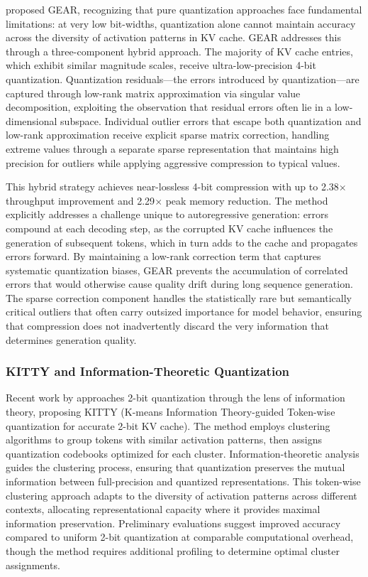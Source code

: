 \citet{kang2024gear} proposed GEAR, recognizing that pure quantization approaches face fundamental limitations: at very low bit-widths, quantization alone cannot maintain accuracy across the diversity of activation patterns in KV cache. GEAR addresses this through a three-component hybrid approach. The majority of KV cache entries, which exhibit similar magnitude scales, receive ultra-low-precision 4-bit quantization. Quantization residuals---the errors introduced by quantization---are captured through low-rank matrix approximation via singular value decomposition, exploiting the observation that residual errors often lie in a low-dimensional subspace. Individual outlier errors that escape both quantization and low-rank approximation receive explicit sparse matrix correction, handling extreme values through a separate sparse representation that maintains high precision for outliers while applying aggressive compression to typical values.

This hybrid strategy achieves near-lossless 4-bit compression with up to 2.38$\times$ throughput improvement and 2.29$\times$ peak memory reduction. The method explicitly addresses a challenge unique to autoregressive generation: errors compound at each decoding step, as the corrupted KV cache influences the generation of subsequent tokens, which in turn adds to the cache and propagates errors forward. By maintaining a low-rank correction term that captures systematic quantization biases, GEAR prevents the accumulation of correlated errors that would otherwise cause quality drift during long sequence generation. The sparse correction component handles the statistically rare but semantically critical outliers that often carry outsized importance for model behavior, ensuring that compression does not inadvertently discard the very information that determines generation quality.

\subsubsection{KITTY and Information-Theoretic Quantization}

Recent work by \citet{yuan2024kitty} approaches 2-bit quantization through the lens of information theory, proposing KITTY (K-means Information Theory-guided Token-wise quantization for accurate 2-bit KV cache). The method employs clustering algorithms to group tokens with similar activation patterns, then assigns quantization codebooks optimized for each cluster. Information-theoretic analysis guides the clustering process, ensuring that quantization preserves the mutual information between full-precision and quantized representations. This token-wise clustering approach adapts to the diversity of activation patterns across different contexts, allocating representational capacity where it provides maximal information preservation. Preliminary evaluations suggest improved accuracy compared to uniform 2-bit quantization at comparable computational overhead, though the method requires additional profiling to determine optimal cluster assignments.

